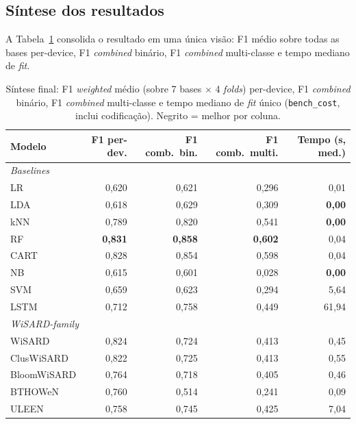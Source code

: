 \subsection{Síntese dos resultados}

A Tabela~\ref{tab:final_consolidada} consolida o resultado em uma
única visão: F1 médio sobre todas as bases per-device, F1
\emph{combined} binário, F1 \emph{combined} multi-classe e tempo
mediano de \emph{fit}.

\begin{table}[ht]
  \centering
  \caption{Síntese final: F1 \emph{weighted} médio (sobre 7 bases $\times$
           4 \emph{folds}) per-device, F1 \emph{combined} binário,
           F1 \emph{combined} multi-classe e tempo mediano de \emph{fit}
           único (\texttt{bench\_cost}, inclui codificação). Negrito =
           melhor por coluna.}
  \label{tab:final_consolidada}
  \small
  \begin{tabular}{lrrrr}
    \toprule
    \textbf{Modelo} & \textbf{F1 per-dev.} & \textbf{F1 comb.\ bin.} & \textbf{F1 comb.\ multi.} & \textbf{Tempo (s, med.)} \\
    \midrule
    \multicolumn{5}{l}{\textit{Baselines}} \\
    LR    & 0{,}620 & 0{,}621 & 0{,}296 & 0{,}01 \\
    LDA   & 0{,}618 & 0{,}629 & 0{,}309 & \textbf{0{,}00} \\
    kNN   & 0{,}789 & 0{,}820 & 0{,}541 & \textbf{0{,}00} \\
    RF    & \textbf{0{,}831} & \textbf{0{,}858} & \textbf{0{,}602} & 0{,}04 \\
    CART  & 0{,}828 & 0{,}854 & 0{,}598 & 0{,}04 \\
    NB    & 0{,}615 & 0{,}601 & 0{,}028 & \textbf{0{,}00} \\
    SVM   & 0{,}659 & 0{,}623 & 0{,}294 & 5{,}64 \\
    LSTM  & 0{,}712 & 0{,}758 & 0{,}449 & 61{,}94 \\
    \midrule
    \multicolumn{5}{l}{\textit{WiSARD-family}} \\
    WiSARD       & 0{,}824 & 0{,}724 & 0{,}413 & 0{,}45 \\
    ClusWiSARD   & 0{,}822 & 0{,}725 & 0{,}413 & 0{,}55 \\
    BloomWiSARD  & 0{,}764 & 0{,}718 & 0{,}405 & 0{,}46 \\
    BTHOWeN      & 0{,}760 & 0{,}514 & 0{,}241 & 0{,}09 \\
    ULEEN        & 0{,}758 & 0{,}745 & 0{,}425 & 7{,}04 \\
    \bottomrule
  \end{tabular}
\end{table}

